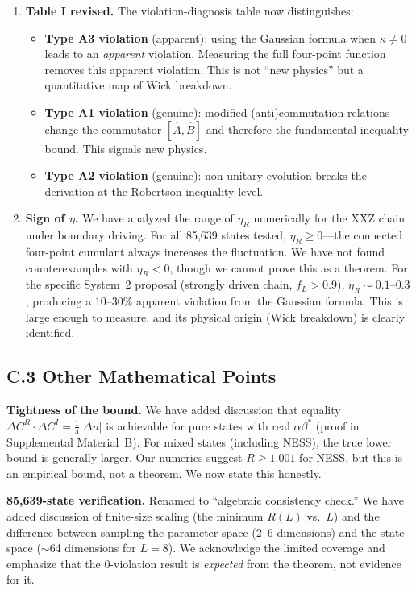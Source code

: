 \documentclass[11pt,a4paper]{article}
\begin{document}
\begin{enumerate}[leftmargin=*]
\item \textbf{Table I revised.} The violation-diagnosis table now distinguishes:
\begin{itemize}
\item \textbf{Type A3 violation} (apparent): using the Gaussian formula when $\kappa \neq 0$ leads to an \emph{apparent} violation. Measuring the full four-point function removes this apparent violation. This is not ``new physics'' but a quantitative map of Wick breakdown.
\item \textbf{Type A1 violation} (genuine): modified (anti)commutation relations change the commutator $[\hat{A}, \hat{B}]$ and therefore the fundamental inequality bound. This signals new physics.
\item \textbf{Type A2 violation} (genuine): non-unitary evolution breaks the derivation at the Robertson inequality level.
\end{itemize}

\item \textbf{Sign of $\eta$.} We have analyzed the range of $\eta_R$ numerically for the XXZ chain under boundary driving. For all 85,639 states tested, $\eta_R \geq 0$---the connected four-point cumulant always increases the fluctuation. We have not found counterexamples with $\eta_R < 0$, though we cannot prove this as a theorem. For the specific System~2 proposal (strongly driven chain, $f_L > 0.9$), $\eta_R \sim 0.1$--$0.3$, producing a 10--30\% apparent violation from the Gaussian formula. This is large enough to measure, and its physical origin (Wick breakdown) is clearly identified.
\end{enumerate}

\subsection*{C.3 Other Mathematical Points}

\textbf{Tightness of the bound.} We have added discussion that equality $\Delta C^R \cdot \Delta C^I = \frac{1}{4}|\Delta n|$ is achievable for pure states with real $\alpha\beta^*$ (proof in Supplemental Material~B). For mixed states (including NESS), the true lower bound is generally larger. Our numerics suggest $R \geq 1.001$ for NESS, but this is an empirical bound, not a theorem. We now state this honestly.

\textbf{85,639-state verification.} Renamed to ``algebraic consistency check.'' We have added discussion of finite-size scaling (the minimum $R(L)$ vs.\ $L$) and the difference between sampling the parameter space (2--6 dimensions) and the state space ($\sim$64 dimensions for $L=8$). We acknowledge the limited coverage and emphasize that the 0-violation result is \emph{expected} from the theorem, not evidence for it.
\end{document}

